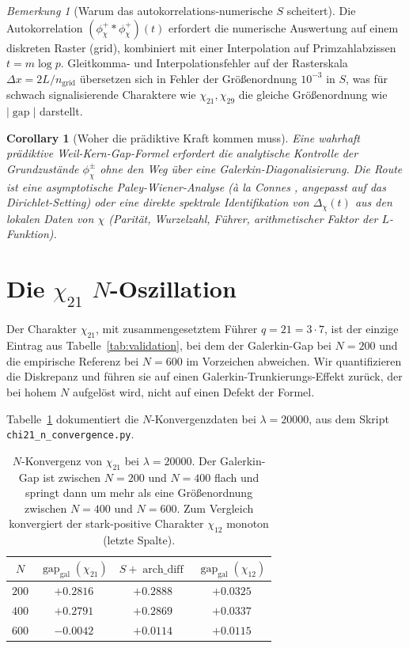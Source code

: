 \documentclass[a4paper,10pt,twocolumn]{article}
\newtheorem{corollary}[theorem]{Corollary}
\theoremstyle{definition}
\theoremstyle{remark}
\newtheorem{remark}[theorem]{Bemerkung}
\newcommand{\gap}{\operatorname{gap}}
\newcommand{\chifn}{\chi}
\newcommand{\Deltachi}{\Delta_{\chifn}}
\newcommand{\archdiff}{\operatorname{arch\_diff}}
\begin{document}
\begin{remark}[Warum das autokorrelations-numerische $S$ scheitert]
Die Autokorrelation $(\phi_{\chifn}^+\ast\phi_{\chifn}^+)(t)$ erfordert
die numerische Auswertung auf einem diskreten Raster (grid), kombiniert mit einer Interpolation auf
Primzahlabzissen $t=m\log p$. Gleitkomma- und Interpolationsfehler
auf der Rasterskala $\Delta x = 2L/n_{\mathrm{grid}}$ übersetzen sich in Fehler
der Größenordnung $10^{-3}$ in $S$, was für schwach signalisierende
Charaktere wie $\chi_{21},\chi_{29}$ die gleiche Größenordnung wie $|\gap|$ darstellt.
\end{remark}

\begin{corollary}[Woher die prädiktive Kraft kommen muss]
\label{cor:paleywiener}
Eine wahrhaft prädiktive Weil-Kern-Gap-Formel erfordert die analytische Kontrolle
der Grundzustände $\phi^\pm_{\chifn}$ \emph{ohne} den Weg über
eine Galerkin-Diagonalisierung. Die Route ist eine asymptotische Paley-Wiener-Analyse
(\`a la Connes \cite{Connes}, angepasst auf das Dirichlet-Setting) oder eine
direkte spektrale Identifikation von $\Deltachi(t)$ aus den lokalen Daten
von $\chifn$ (Parität, Wurzelzahl, Führer, arithmetischer Faktor der
$L$-Funktion).
\end{corollary}

\section{\texorpdfstring{Die $\chi_{21}$ $N$-Oszillation}{Die chi21 N-Oszillation}}
\label{sec:chi21}

Der Charakter $\chifn_{21}$, mit zusammengesetztem Führer $q=21=3\cdot 7$,
ist der einzige Eintrag aus Tabelle~\ref{tab:validation}, bei dem der Galerkin-Gap
bei $N=200$ und die empirische Referenz bei $N=600$ im Vorzeichen abweichen.
Wir quantifizieren die Diskrepanz und führen sie auf einen
Galerkin-Trunkierungs-Effekt zurück, der bei hohem $N$ aufgelöst wird, nicht auf einen
Defekt der Formel.

Tabelle~\ref{tab:chi21} dokumentiert die $N$-Konvergenzdaten bei
$\lambda=20000$, aus dem Skript \texttt{chi21\_n\_convergence.py}.

\begin{table}[h]
\caption{$N$-Konvergenz von $\chifn_{21}$ bei $\lambda=20000$.
  Der Galerkin-Gap ist zwischen $N=200$ und $N=400$ flach und
  springt dann um mehr als eine Größenordnung zwischen $N=400$ und
  $N=600$. Zum Vergleich konvergiert der stark-positive Charakter
  $\chifn_{12}$ monoton (letzte Spalte).}
\label{tab:chi21}
\centering\small
\begin{tabular}{@{}cccc@{}}
\toprule
$N$ & $\gap_{\mathrm{gal}}(\chifn_{21})$ & $S+\archdiff$ & $\gap_{\mathrm{gal}}(\chifn_{12})$ \\
\midrule
$200$ & $+0.2816$ & $+0.2888$ & $+0.0325$ \\
$400$ & $+0.2791$ & $+0.2869$ & $+0.0337$ \\
$600$ & $-0.0042$ & $+0.0114$ & $+0.0115$ \\
\bottomrule
\end{tabular}
\end{table}
\end{document}
